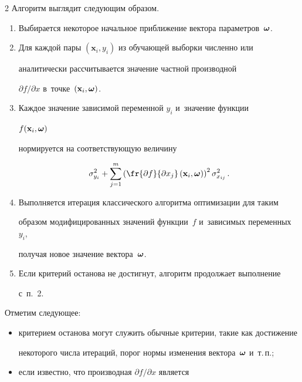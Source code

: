 \begin{multicols}{2}
Алгоритм выглядит следующим образом.

\begin{enumerate}[1.]

  \item Выбирается некоторое начальное приближение вектора па\-ра\-мет\-ров~$\boldsymbol{\omega}$.

  \item Для каждой пары $(\mathbf{x}_i, y_i)$ из обуча\-ющей выборки численно или

    аналитически рассчитывается значение част\-ной производной

    ${\partial f}/{\partial x}$ в~точке~$(\mathbf{x}_i, \boldsymbol{\omega})$.

  \item Каждое значение зависимой переменной $y_i$ и~значение функции 

$f(\mathbf{x}_i, \boldsymbol{\omega})$

    нормируется на соответствующую величину

$$

      \sigma_{y_i}^2 + \sum\limits_{j = 1}^m \left(\fr{\partial f}{\partial 

x_j}\left(\mathbf{x}_i, \bomega\right)\right)^2 \sigma^2_{x_{ij}}\,.

$$

  \item Выполняется итерация классического алгоритма оптимизации для таким 

образом модифицированных значений функции~$f$ и~зависимых переменных~$y_i$, 

получая     новое значение вектора~$\boldsymbol{\omega}$.

  \item Если критерий останова не достигнут, алгоритм продолжает выполнение 

  с~п.~2.

\end{enumerate}



Отметим следующее:

\begin{itemize}

  \item критерием останова могут служить обычные критерии, такие как достижение 

некоторого     числа итераций, порог нормы изменения вектора~$\boldsymbol{\omega}$ и~т.\,п.;

  \item если известно, что производная ${\partial f}/{\partial x}$ является 


\end{itemize}
\end{multicols}
